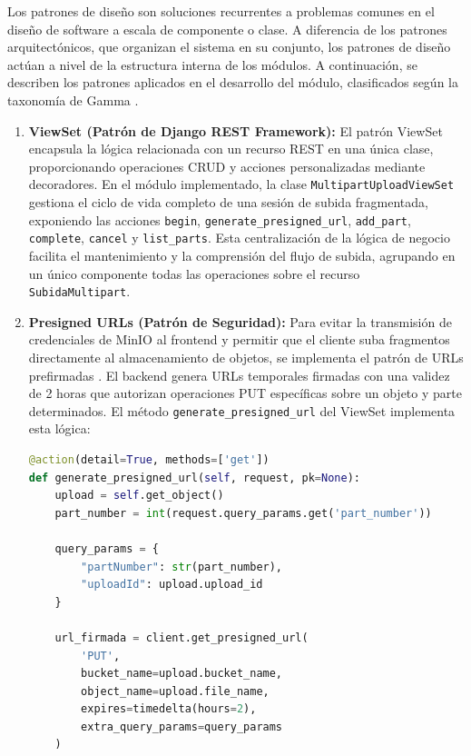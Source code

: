 Los patrones de diseño son soluciones recurrentes a problemas comunes en el diseño de software a
escala de componente o clase. A diferencia de los patrones arquitectónicos, que organizan el sistema
en su conjunto, los patrones de diseño actúan a nivel de la estructura interna de los módulos. A
continuación, se describen los patrones aplicados en el desarrollo del módulo, clasificados según la
taxonomía de Gamma \citep{Gamma1994}.

\begin{enumerate}
  \item \textbf{ViewSet (Patrón de Django REST Framework):} El patrón ViewSet encapsula la lógica
  relacionada con un recurso REST en una única clase, proporcionando operaciones CRUD y acciones
  personalizadas mediante decoradores. En el módulo implementado, la clase
  \texttt{MultipartUploadViewSet} gestiona el ciclo de vida completo de una sesión de subida
  fragmentada, exponiendo las acciones \texttt{begin}, \texttt{generate\_presigned\_url},
  \texttt{add\_part}, \texttt{complete}, \texttt{cancel} y \texttt{list\_parts}. Esta
  centralización de la lógica de negocio facilita el mantenimiento y la comprensión del flujo de
  subida, agrupando en un único componente todas las operaciones sobre el recurso
  \texttt{SubidaMultipart}.

  \item \textbf{Presigned URLs (Patrón de Seguridad):} Para evitar la transmisión de credenciales
  de MinIO al frontend y permitir que el cliente suba fragmentos directamente al almacenamiento de
  objetos, se implementa el patrón de URLs prefirmadas \citep{AWS2023}. El backend genera URLs temporales firmadas
  con una validez de 2 horas que autorizan operaciones PUT específicas sobre un objeto y parte
  determinados. El método \texttt{generate\_presigned\_url} del ViewSet implementa esta lógica:

\begin{lstlisting}[language=Python, caption={Generación de URLs prefirmadas}]
@action(detail=True, methods=['get'])
def generate_presigned_url(self, request, pk=None):
    upload = self.get_object()
    part_number = int(request.query_params.get('part_number'))
    
    query_params = {
        "partNumber": str(part_number),
        "uploadId": upload.upload_id
    }
    
    url_firmada = client.get_presigned_url(
        'PUT',
        bucket_name=upload.bucket_name,
        object_name=upload.file_name,
        expires=timedelta(hours=2),
        extra_query_params=query_params
    )
    

\end{lstlisting}
\end{enumerate}
